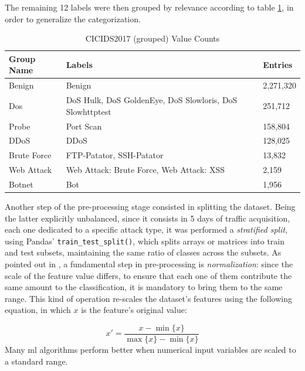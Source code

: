 \noindent The remaining 12 labels were then grouped by relevance according to table \ref{tab:grouped-dataset-distribution}, in order to generalize the categorization.

\begin{table}[h!]
    \centering
    \begin{tabular}{l|l|l}
        \toprule 
        Group Name & Labels & Entries \\
        \midrule
        \rowcolor{black!10} Benign & Benign & 2,271,320 \\
        Dos & DoS Hulk, DoS GoldenEye, DoS Slowloris, DoS Slowhttptest &  251,712 \\
        \rowcolor{black!10}Probe & Port Scan & 158,804 \\
        DDoS & DDoS & 128,025 \\
        \rowcolor{black!10}Brute Force & FTP-Patator, SSH-Patator  & 13,832 \\
        Web Attack & Web Attack: Brute Force, Web Attack: XSS & 2,159 \\
        \rowcolor{black!10}Botnet & Bot & 1,956 \\
        \bottomrule
    \end{tabular}
    \caption{CICIDS2017 (grouped) Value Counts}
    \label{tab:grouped-dataset-distribution}
\end{table}

\noindent Another step of the pre-processing stage consisted in splitting the dataset. Being the latter explicitly unbalanced, since it consists in 5 days of traffic acquisition, each one dedicated to a specific attack type, it was performed a \textit{stratified split}, using Pandas' \texttt{train\_test\_split()}, which splits arrays or matrices into train and test subsets, maintaining the same ratio of classes across the subsets. As pointed out in \cite{Mozley2020}, a fundamental step in pre-processing is \textit{normalization}: since the scale of the feature value differs, to ensure that each one of them contribute the same amount to the classification, it is mandatory to bring them to the same range. This kind of operation re-scales the dataset's features using the following equation, in which $x$ is the feature's original value:

\begin{equation}
    x\prime=\frac{x-\min\{x\}}{\max\{x\}-\min\{x\}}
\end{equation}
Many \gls{ml} algorithms perform better when numerical input variables are scaled to a standard range.

